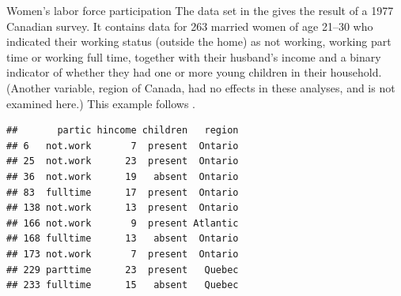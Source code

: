 \documentclass[11pt]{book}
\renewenvironment{knitrout}{\small\renewcommand{\baselinestretch}{.85}}{} %
\begin{document}
\begin{Example}[wlfpart1]{Women's labor force participation}
The data set  in the 
gives the result of a 1977 Canadian survey.  
It contains data for 263 married women of age 21--30 who indicated their 
working status (outside the home)
as not working, working part time or working
full time, together with their husband's income and
a binary indicator of whether they had one or more
young children in their
household.  (Another variable, region of Canada, had no effects in
these analyses, and is not examined here.) This example follows
\citet[\S 5.8]{FoxWeisberg:2011}.

\begin{knitrout}
\color{fgcolor}\begin{kframe}
\begin{alltt}
   
\hlstd{(}\hlstd{,} \hlstd{=}\hlstd{)}
\end{alltt}
\begin{verbatim}
##       partic hincome children   region
## 6   not.work       7  present  Ontario
## 25  not.work      23  present  Ontario
## 36  not.work      19   absent  Ontario
## 83  fulltime      17  present  Ontario
## 138 not.work      13  present  Ontario
## 166 not.work       9  present Atlantic
## 168 fulltime      13   absent  Ontario
## 173 not.work       7  present  Ontario
## 229 parttime      23  present   Quebec
## 233 fulltime      15   absent   Quebec
\end{verbatim}
\end{kframe}
\end{knitrout}


\end{Example}
\end{document}
